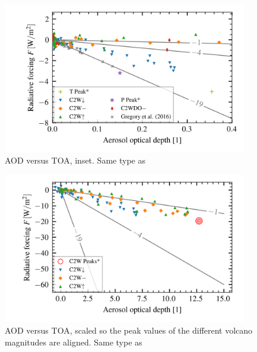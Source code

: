 \documentclass{ametsocV5}
\begin{document}
\begin{figure}
	\begin{center}
		\includegraphics[width=0.95\textwidth]{figures/aod_vs_toa_avg_inset.png}
	\end{center}
	\caption{AOD versus TOA, inset. Same type as \cite{gregory2016}}
	\label{fig:aod_vs_toa_inset}
\end{figure}

\begin{figure}
	\begin{center}
		\includegraphics[width=0.95\textwidth]{figures/aod_vs_toa_avg_scaled.png}
	\end{center}
	\caption{AOD versus TOA, scaled so the peak values of the different volcano
		magnitudes are aligned. Same type as \cite{gregory2016}}
	\label{fig:aod_vs_toa_scaled}
\end{figure}
\end{document}
